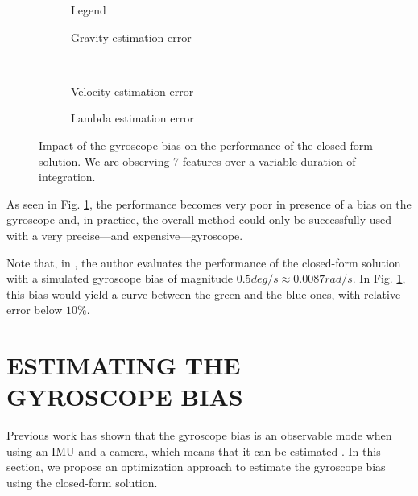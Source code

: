 \documentclass[letterpaper, 10 pt, conference]{ieeeconf}  %
\begin{document}
\begin{figure}
  \centering
        \hspace{0.2\columnwidth}%
        \begin{subfigure}[b]{0.3\columnwidth}
                \resizebox{\columnwidth}{!}{}
                \caption{Legend}

        \end{subfigure}%
        \begin{subfigure}[b]{0.5\columnwidth}
                \resizebox{\columnwidth}{!}{}
                \caption{Gravity estimation error}

        \end{subfigure}
        ~
        \begin{subfigure}[b]{0.5\columnwidth}
                \resizebox{\columnwidth}{!}{}
                \caption{Velocity estimation error}

        \end{subfigure}%
        \begin{subfigure}[b]{0.5\columnwidth}
                \resizebox{\columnwidth}{!}{}
                \caption{Lambda estimation error}

        \end{subfigure}
        \caption{Impact of the gyroscope bias on the performance of the closed-form solution. We are observing 7 features over a variable duration of integration. \label{fig:biasGyroCF}}
\end{figure}


As seen in Fig. \ref{fig:biasGyroCF}, the performance becomes very poor in presence of a bias on the gyroscope and, in practice, the overall method could only be successfully used with a very precise---and expensive---gyroscope.

Note that, in \cite{Martinelli2014}, the author evaluates the performance of the closed-form solution with a simulated gyroscope bias of magnitude $0.5deg/s \approx 0.0087 rad/s$.
In Fig. \ref{fig:biasGyroCF}, this bias would yield a curve between the green and the blue ones, with relative error below $10\%$.


\section{ESTIMATING THE GYROSCOPE BIAS}\label{SectionCalibration}

Previous work has shown that the gyroscope bias is an observable mode when using an IMU and a camera, which means that it can be estimated \cite{Martinelli2012}.
In this section, we propose an optimization approach to estimate the gyroscope bias using the closed-form solution.
\end{document}
